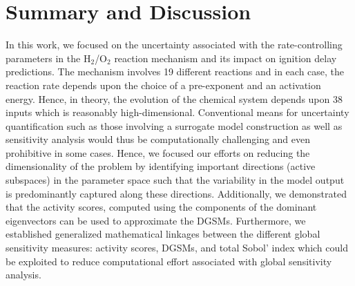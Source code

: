 \section{Summary and Discussion}
\label{sec:conc}

%
 
 In this work, we focused on the uncertainty associated with the rate-controlling parameters in
 the H$_2$/O$_2$ reaction mechanism and its impact on ignition delay predictions. The mechanism
 involves 19 different reactions and in each case, the reaction rate depends upon the choice of
 a pre-exponent and an activation energy. Hence, in theory, the evolution of the chemical system
 depends upon 38 inputs which is reasonably high-dimensional. Conventional means
 for uncertainty quantification such as those involving a surrogate model construction as well as
 sensitivity analysis would thus be computationally challenging and even prohibitive in some cases. 
 Hence, we focused our efforts on reducing the dimensionality of the problem by identifying important
 directions (active subspaces) in the parameter space such that the variability in the model output is 
 predominantly captured along these directions. Additionally, we demonstrated that the activity scores,
 computed using the components of the dominant eigenvectors can be used to approximate the
 DGSMs. Furthermore, we established generalized mathematical linkages between the different global sensitivity measures:
 activity scores, DGSMs, and total Sobol' index which could be exploited to reduce computational effort 
 associated with global sensitivity analysis. 
 
